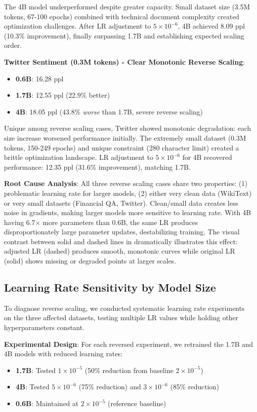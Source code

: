The 4B model underperformed despite greater capacity. Small dataset size (3.5M tokens, 67-100 epochs) combined with technical document complexity created optimization challenges. After LR adjustment to $5 \times 10^{-6}$, 4B achieved 8.09 ppl (10.3\% improvement), finally surpassing 1.7B and establishing expected scaling order.

\textbf{Twitter Sentiment (0.3M tokens) - Clear Monotonic Reverse Scaling}:
\begin{itemize}
\item \textbf{0.6B}: 16.28 ppl
\item \textbf{1.7B}: 12.55 ppl (22.9\% better)
\item \textbf{4B}: 18.05 ppl (43.8\% \textit{worse} than 1.7B, severe reverse scaling)
\end{itemize}

Unique among reverse scaling cases, Twitter showed monotonic degradation: each size increase worsened performance initially. The extremely small dataset (0.3M tokens, 150-249 epochs) and unique constraint (280 character limit) created a brittle optimization landscape. LR adjustment to $5 \times 10^{-6}$ for 4B recovered performance: 12.35 ppl (31.6\% improvement), matching 1.7B.

\textbf{Root Cause Analysis}: All three reverse scaling cases share two properties: (1) problematic learning rate for larger models, (2) either very clean data (WikiText) or very small datasets (Financial QA, Twitter). Clean/small data creates less noise in gradients, making larger models more sensitive to learning rate. With 4B having 6.7$\times$ more parameters than 0.6B, the same LR produces disproportionately large parameter updates, destabilizing training. The visual contrast between solid and dashed lines in  dramatically illustrates this effect: adjusted LR (dashed) produces smooth, monotonic curves while original LR (solid) shows missing or degraded points at larger scales.

\subsection{Learning Rate Sensitivity by Model Size}

To diagnose reverse scaling, we conducted systematic learning rate experiments on the three affected datasets, testing multiple LR values while holding other hyperparameters constant.

\textbf{Experimental Design}: For each reversed experiment, we retrained the 1.7B and 4B models with reduced learning rates:
\begin{itemize}
\item \textbf{1.7B}: Tested $1 \times 10^{-5}$ (50\% reduction from baseline $2 \times 10^{-5}$)
\item \textbf{4B}: Tested $5 \times 10^{-6}$ (75\% reduction) and $3 \times 10^{-6}$ (85\% reduction)
\item \textbf{0.6B}: Maintained at $2 \times 10^{-5}$ (reference baseline)
\end{itemize}

